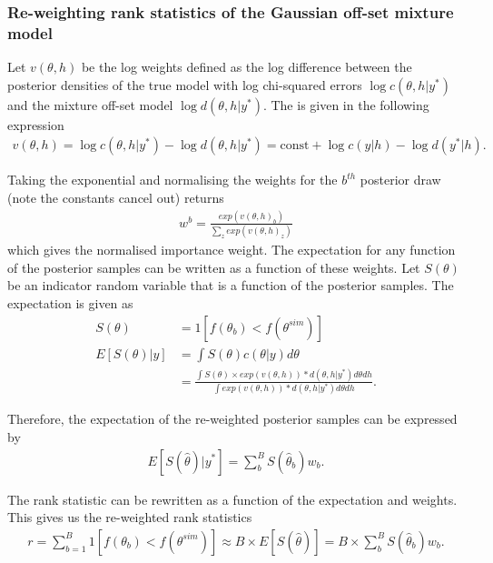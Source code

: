 \documentclass[12pt, a4paper]{article}
\begin{document}
    \subsubsection{Re-weighting rank statistics of the Gaussian off-set mixture model}
    Let $v(\theta, h)$ be the log weights defined as the log difference between the posterior densities of the true model with log chi-squared errors $\log c(\theta, h | y^{\ast})$ and the mixture off-set model $\log d(\theta, h | y^{\ast})$. The is given in the following expression
    \begin{align}
        v(\theta, h) = \log c(\theta, h | y^{\ast}) - \log  d(\theta, h | y^{\ast}) = \text{const} + \log c(y|h) - \log d(y^{\ast} | h).
    \end{align}

    Taking the exponential and normalising the weights for the $b^{th}$ posterior draw (note the constants cancel out) returns
    \begin{align}
    w^b = \frac{exp(v(\theta, h)_b)}{\sum_z exp(v(\theta, h)_z)}
    \end{align}
    which gives the normalised importance weight. The expectation for any function of the posterior samples can be written as a function of these weights. Let $S(\theta)$ be an indicator random variable that is a function of the posterior samples. The expectation is given as
    \begin{align}
    S(\theta) &= 1[f(\theta_b) < f(\theta^{sim})] \\
    E[S(\theta) | y] &= \int S(\theta) c(\theta | y) d\theta\\ 
    &= \frac{\int S(\theta)\times exp(v(\theta, h)) * d(\theta, h | y^{\ast})d\theta d h}{\int exp(v(\theta, h)) * d(\theta, h | y^{\ast})d\theta d h}.
    \end{align}
    
    Therefore, the expectation of the re-weighted posterior samples can be expressed by
    \begin{align}
    E[S(\hat{\theta}) | y^{\ast}] = \sum_b^B S(\hat{\theta}_b)w_b.
    \end{align}

    The rank statistic can be rewritten as a function of the expectation and weights. This gives us the re-weighted rank statistics
    \begin{align}
    r = \sum_{b=1}^{B}1[f(\theta_{b}) < f(\theta^{sim})] \approx  B\times E[S(\hat{\theta})] = B\times \sum_b^B S(\hat{\theta}_b)w_b.
    \end{align}
\end{document}
